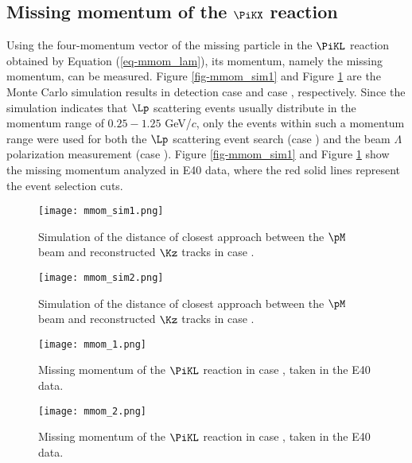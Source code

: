 \subsection{Missing momentum of the $\PiKX$ reaction}
Using the four-momentum vector of the missing particle in the $\PiKL$ reaction obtained by Equation (\ref{eq-mmom_lam}), its momentum, namely the missing momentum, can be measured. Figure \ref{fig-mmom_sim1} and Figure \ref{fig-mmom_sim2} are the Monte Carlo simulation results in detection case  and case , respectively. Since the simulation indicates that $\Lp$ scattering events usually distribute in the momentum range of $0.25 - 1.25$ GeV/$c$, only the events within such a momentum range were used for both the $\Lp$ scattering event search (case ) and the beam $\Lambda$ polarization measurement (case ). Figure \ref{fig-mmom_sim1} and Figure \ref{fig-mmom_sim2} show the missing momentum analyzed in E40 data, where the red solid lines represent the event selection cuts.

\begin{figure}[!h]
  \begin{minipage}[t]{0.48\columnwidth}
    \centering
    \texttt{[image: mmom\_sim1.png]}
    \caption{Simulation of the distance of closest approach between the $\pM$ beam and reconstructed $\Kz$ tracks in case .}
    \label{fig-mmom_sim1}
  \end{minipage}
  \hspace{0.04\columnwidth} %
  \begin{minipage}[t]{0.48\columnwidth}
    \centering
    \texttt{[image: mmom\_sim2.png]}
    \caption{Simulation of the distance of closest approach between the $\pM$ beam and reconstructed $\Kz$ tracks in case .}
    \label{fig-mmom_sim2}
  \end{minipage}
\end{figure}

\begin{figure}[!h]
  \begin{minipage}[t]{0.48\columnwidth}
    \centering
    \texttt{[image: mmom\_1.png]}
    \caption{Missing momentum of the $\PiKL$ reaction in case , taken in the E40 data.}
    \label{fig-mmom_1}
  \end{minipage}
  \hspace{0.04\columnwidth} %
  \begin{minipage}[t]{0.48\columnwidth}
    \centering
    \texttt{[image: mmom\_2.png]}
    \caption{Missing momentum of the $\PiKL$ reaction in case , taken in the E40 data.}
    \label{fig-mmom_2}
  \end{minipage}
\end{figure}


%
